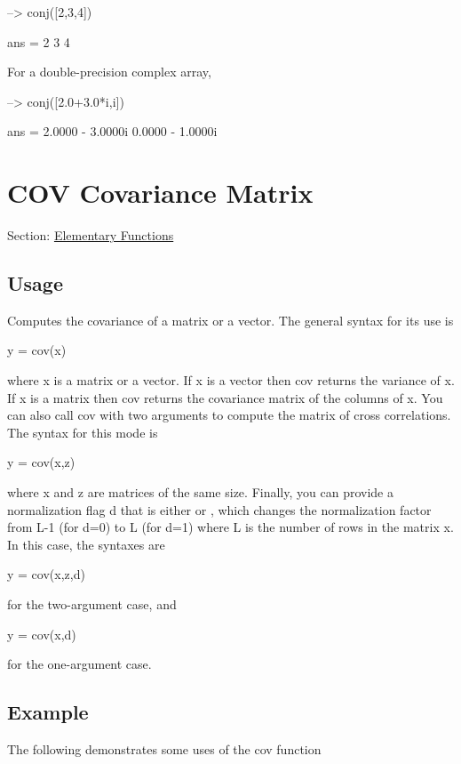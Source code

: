 \begin{DoxyVerbInclude}
--> conj([2,3,4])

ans = 
 2 3 4 
\end{DoxyVerbInclude}


For a double-\/precision complex array,


\begin{DoxyVerbInclude}
--> conj([2.0+3.0*i,i])

ans = 
   2.0000 -  3.0000i   0.0000 -  1.0000i 
\end{DoxyVerbInclude}
 \hypertarget{elementary_cov}{}\section{C\-O\-V Covariance Matrix}\label{elementary_cov}
Section\-: \hyperlink{sec_elementary}{Elementary Functions} \hypertarget{vtkwidgets_vtkxyplotwidget_Usage}{}\subsection{Usage}\label{vtkwidgets_vtkxyplotwidget_Usage}
Computes the covariance of a matrix or a vector. The general syntax for its use is \begin{DoxyVerb}  y = cov(x)
\end{DoxyVerb}
 where {\ttfamily x} is a matrix or a vector. If {\ttfamily x} is a vector then {\ttfamily cov} returns the variance of {\ttfamily x}. If {\ttfamily x} is a matrix then {\ttfamily cov} returns the covariance matrix of the columns of {\ttfamily x}. You can also call {\ttfamily cov} with two arguments to compute the matrix of cross correlations. The syntax for this mode is \begin{DoxyVerb}  y = cov(x,z)
\end{DoxyVerb}
 where {\ttfamily x} and {\ttfamily z} are matrices of the same size. Finally, you can provide a normalization flag {\ttfamily d} that is either {} or {}, which changes the normalization factor from {\ttfamily L-\/1} (for {\ttfamily d=0}) to {\ttfamily L} (for {\ttfamily d=1}) where {\ttfamily L} is the number of rows in the matrix {\ttfamily x}. In this case, the syntaxes are \begin{DoxyVerb}  y = cov(x,z,d)
\end{DoxyVerb}
 for the two-\/argument case, and \begin{DoxyVerb}  y = cov(x,d)
\end{DoxyVerb}
 for the one-\/argument case. \hypertarget{variables_struct_Example}{}\subsection{Example}\label{variables_struct_Example}
The following demonstrates some uses of the {\ttfamily cov} function


